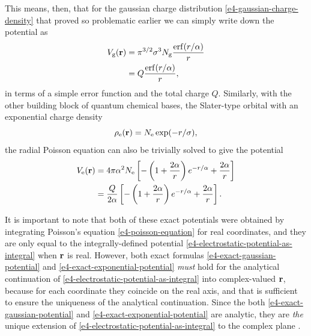 This means, then, that for the gaussian charge distribution \eqref{e4-gaussian-charge-density} that proved so problematic earlier we can simply write down the potential as
\begin{subequations}
\label{e4-exact-gaussian-potential}
\begin{align}
\Vg(\vbr) 
& = 
\pi^{3/2} \sigma^3 \normg \frac{ \erf(r/\alpha) }{ r }
\\ & = 
Q \frac{ \erf(r/\alpha) }{ r }
,
\end{align}
\end{subequations}%
in terms of a simple error function  and the total charge $Q$. Similarly, with the other building block of quantum chemical bases, the Slater-type orbital with an exponential charge density
\begin{equation}
\rho_\mathrm{e}(\vb{r}) = N_\mathrm{e} \exp(-r/\sigma)
,
\label{e4-exponential-charge-density}
\end{equation}
the radial Poisson equation can also be trivially solved to give the potential
\begin{subequations}
\label{e4-exact-exponential-potential}%
\begin{align}
V_\mathrm{e}(\vb{r}) 
& = 
4\pi \alpha^2 N_\mathrm{e} \left[ - \left( 1 + \frac{2\alpha}{r} \right) e^{-r/\alpha} + \frac{2\alpha}{r} \right]
\\ & = 
 \frac{Q}{2\alpha} \left[ - \left( 1 + \frac{2\alpha}{r} \right) e^{-r/\alpha} + \frac{2\alpha}{r} \right]
.
\end{align}%
\end{subequations} %

It is important to note that both of these exact potentials were obtained by integrating Poisson's equation \eqref{e4-poisson-equation} for real coordinates, and they are only equal to the integrally-defined potential \eqref{e4-electrostatic-potential-as-integral} when $\vb{r}$ is real. However, both exact formulas \eqref{e4-exact-gaussian-potential} and \eqref{e4-exact-exponential-potential} \textit{must} hold for the analytical continuation of \eqref{e4-electrostatic-potential-as-integral} into complex-valued $\vb{r}$, because for each coordinate they coincide on the real axis, and that is sufficient to ensure the uniqueness of the analytical continuation. Since the both \eqref{e4-exact-gaussian-potential} and \eqref{e4-exact-exponential-potential} are analytic, they are \textit{the} unique extension of \eqref{e4-electrostatic-potential-as-integral} to the complex plane \cite[\S108]{churchill_complex_variables}.


